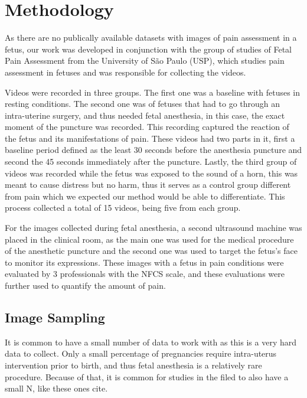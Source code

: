 \chapter{Methodology}

As there are no publically available datasets with images of pain assessment in a fetus, our work was developed in conjunction with the group of studies of Fetal Pain Assessment from the University of São Paulo (USP), which studies pain assessment in fetuses and was responsible for collecting the videos.

Videos were recorded in three groups. The first one was a baseline with fetuses in resting conditions. The second one was of fetuses that had to go through an intra-uterine surgery, and thus needed fetal anesthesia, in this case, the exact moment of the puncture was recorded. This recording captured the reaction of the fetus and its manifestations of pain. These videos had two parts in it, first a baseline period defined as the least 30 seconds before the anesthesia puncture and second the 45 seconds immediately after the puncture. Lastly, the third group of videos was recorded while the fetus was exposed to the sound of a horn, this was meant to cause distress but no harm, thus it serves as a control group different from pain which we expected our method would be able to differentiate. This process collected a total of 15 videos, being five from each group.


For the images collected during fetal anesthesia, a second ultrasound machine was placed in the clinical room, as the main one was used for the medical procedure of the anesthetic puncture and the second one was used to target the fetus's face to monitor its expressions. These images with a fetus in pain conditions were evaluated by 3 professionals with the NFCS scale, and these evaluations were further used to quantify the amount of pain.

\section{Image Sampling}

It is common to have a small number of data to work with as this is a very hard data to collect. Only a small percentage of pregnancies require intra-uterus intervention prior to birth, and thus fetal anesthesia is a relatively rare procedure. Because of that, it is common for studies in the filed to also have a small N, like these ones cite{}.

